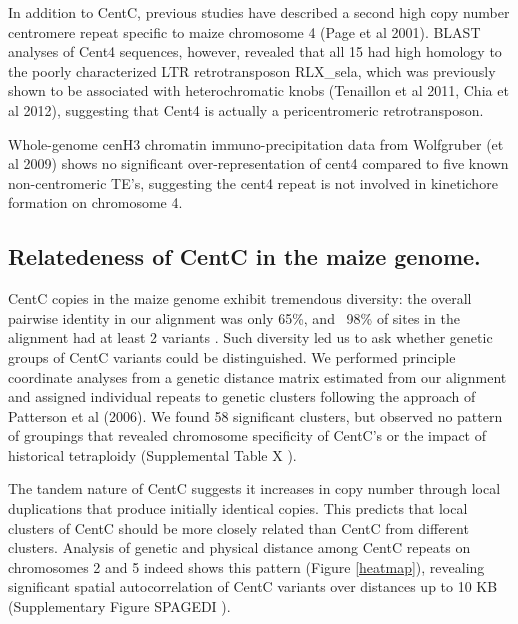 In addition to CentC, previous studies have described a second high copy number centromere repeat specific to maize chromosome 4 (Page et al 2001).   BLAST analyses of Cent4 sequences, however, revealed that all 15 had high homology to the poorly characterized LTR retrotransposon RLX\_sela, which was previously shown to be associated with heterochromatic  knobs (Tenaillon et al 2011, Chia et al 2012), suggesting that Cent4 is actually a pericentromeric retrotransposon. 

Whole-genome cenH3 chromatin immuno-precipitation data from Wolfgruber (et al 2009) shows no significant over-representation of cent4 compared to five known non-centromeric TE’s, suggesting the cent4 repeat is not involved in kinetichore formation on chromosome 4.  
	
\subsection*{Relatedeness of CentC in the maize genome.}

CentC copies in the maize genome exhibit tremendous diversity: the overall pairwise identity in our alignment was only 65\%, and ~98\% of sites in the alignment had at least 2 variants .  Such diversity led us to ask whether genetic groups of CentC variants could be distinguished. We performed principle coordinate analyses from a genetic distance matrix estimated from our alignment and assigned individual repeats to  genetic clusters following the approach of Patterson et al (2006).  We found 58 significant clusters, but observed no pattern of groupings that revealed chromosome specificity of CentC’s or the impact of historical tetraploidy (Supplemental Table X ).

The tandem nature of CentC suggests it increases in copy number through local duplications that produce initially identical copies.  This predicts that local clusters of CentC should be more closely related than CentC from different clusters.  Analysis of genetic and physical distance among CentC repeats on chromosomes 2 and 5 indeed shows this pattern (Figure \ref{heatmap}), revealing significant spatial autocorrelation of CentC variants over distances up to 10 KB (Supplementary Figure SPAGEDI ). 

